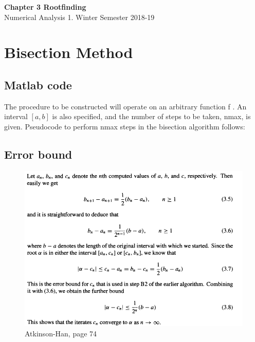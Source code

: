 \documentclass[12pt]{article}
\theoremstyle{theorem}
\begin{document}
\thispagestyle{empty}

\begin{center}
	{\LARGE \bf Chapter 3 Rootfinding}\\[.2cm]
	{\large Numerical Analysis 1. Winter Semester 2018-19}
\end{center}

\section{Bisection Method}

\subsection{Matlab code}
The procedure to be constructed will operate on an arbitrary function f . An interval $[a, b]$ is also specified, and the number of steps to be taken, nmax, is given. Pseudocode to perform nmax steps in the bisection algorithm follows:

\begin{shaded}
 
\end{shaded}

\subsection{Error bound}

\begin{figure}[h!]
	\centering
	\includegraphics[width=0.99\linewidth]{Figures/screenshot002}
	\caption{Atkinson-Han, page 74}
	\label{fig:screenshot002}
\end{figure}
\end{document}
